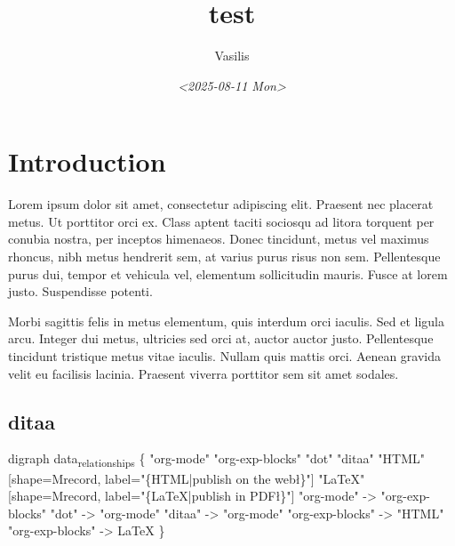\documentclass[11pt]{article}
\author{Vasilis}
\date{\textit{<2025-08-11 Mon>}}
\title{test}
\begin{document}
\maketitle
\tableofcontents

\section{Introduction}
\label{sec:orgf9f93bc}

Lorem ipsum dolor sit amet, consectetur adipiscing elit. Praesent nec placerat metus. Ut porttitor orci ex. Class aptent taciti sociosqu ad litora torquent per conubia nostra, per inceptos himenaeos. Donec tincidunt, metus vel maximus rhoncus, nibh metus hendrerit sem, at varius purus risus non sem. Pellentesque purus dui, tempor et vehicula vel, elementum sollicitudin mauris. Fusce at lorem justo. Suspendisse potenti.

Morbi sagittis felis in metus elementum, quis interdum orci iaculis. Sed et ligula arcu. Integer dui metus, ultricies sed orci at, auctor auctor justo. Pellentesque tincidunt tristique metus vitae iaculis. Nullam quis mattis orci. Aenean gravida velit eu facilisis lacinia. Praesent viverra porttitor sem sit amet sodales.
\subsection{ditaa}
\label{sec:org2cf8ea5}

\begin{dot}
digraph data\textsubscript{relationships} \{
  "org-mode"
  "org-exp-blocks"
  "dot"
  "ditaa"
  "HTML" [shape=Mrecord, label="\{HTML|publish on the web\l\}"]
  "\LaTeX{}" [shape=Mrecord, label="\{\LaTeX{}|publish in PDF\l\}"]
  "org-mode" -> "org-exp-blocks"
  "dot" -> "org-mode"
  "ditaa" -> "org-mode"
  "org-exp-blocks" -> "HTML"
  "org-exp-blocks" -> \LaTeX{}
\}
\end{dot}
\end{document}
